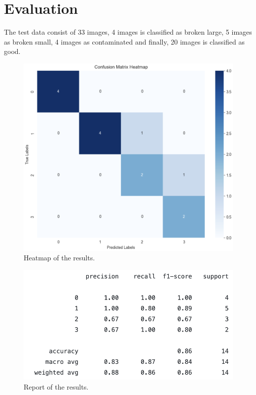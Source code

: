 \section{Evaluation}

The test data consist of 33 images, 4 images is classified as broken large, 5 images as broken small, 4 images as contaminated and finally, 20 images is classified as good.

\begin{figure}[H]
    \centering
    \includegraphics[scale=0.32]{src/images/heatmap_results.png}
    \caption{Heatmap of the results.}
    \label{fig:heatmapresults}
\end{figure}

\begin{figure}[H]
    \centering
    \hspace{-1.4cm}  
    \includegraphics[scale=0.55]{src/images/class_report_result.png}
    \caption{Report of the results.}
    \label{fig:reportresults}
\end{figure}